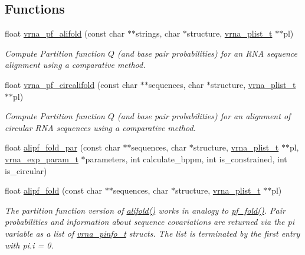 \subsection*{Functions}
\begin{DoxyCompactItemize}
\item 
float \hyperlink{group__consensus__pf__fold_gaef750636c70e597a85ee139197a4350d}{vrna\+\_\+pf\+\_\+alifold} (const char $\ast$$\ast$strings, char $\ast$structure, \hyperlink{group__data__structures_ga8e4eb5e1bfc95776559575beb359af87}{vrna\+\_\+plist\+\_\+t} $\ast$$\ast$pl)
\begin{DoxyCompactList}\small\item\em Compute Partition function $Q$ (and base pair probabilities) for an R\+N\+A sequence alignment using a comparative method. \end{DoxyCompactList}\item 
float \hyperlink{group__consensus__pf__fold_ga017209394a4c1e68d96cd47e61d16d25}{vrna\+\_\+pf\+\_\+circalifold} (const char $\ast$$\ast$sequences, char $\ast$structure, \hyperlink{group__data__structures_ga8e4eb5e1bfc95776559575beb359af87}{vrna\+\_\+plist\+\_\+t} $\ast$$\ast$pl)
\begin{DoxyCompactList}\small\item\em Compute Partition function $Q$ (and base pair probabilities) for an alignment of circular R\+N\+A sequences using a comparative method. \end{DoxyCompactList}\item 
float \hyperlink{group__consensus__pf__fold_ga5e8d54e41bf3d5b6e535d5bdb33c416e}{alipf\+\_\+fold\+\_\+par} (const char $\ast$$\ast$sequences, char $\ast$structure, \hyperlink{group__data__structures_ga8e4eb5e1bfc95776559575beb359af87}{vrna\+\_\+plist\+\_\+t} $\ast$$\ast$pl, \hyperlink{group__energy__parameters_ga01d8b92fe734df8d79a6169482c7d8d8}{vrna\+\_\+exp\+\_\+param\+\_\+t} $\ast$parameters, int calculate\+\_\+bppm, int is\+\_\+constrained, int is\+\_\+circular)
\item 
float \hyperlink{group__consensus__pf__fold_gaa150d3ba7b009a1c27cb6f0eb197f6b4}{alipf\+\_\+fold} (const char $\ast$$\ast$sequences, char $\ast$structure, \hyperlink{group__data__structures_ga8e4eb5e1bfc95776559575beb359af87}{vrna\+\_\+plist\+\_\+t} $\ast$$\ast$pl)
\begin{DoxyCompactList}\small\item\em The partition function version of \hyperlink{group__consensus__mfe__fold_ga4cf00f0659e5f0480335d69e797f05b1}{alifold()} works in analogy to \hyperlink{group__pf__fold_gadc3db3d98742427e7001a7fd36ef28c2}{pf\+\_\+fold()}. Pair probabilities and information about sequence covariations are returned via the \textquotesingle{}pi\textquotesingle{} variable as a list of \hyperlink{group__aln__utils_ga6660dfca23debee7306e0cd53341263f}{vrna\+\_\+pinfo\+\_\+t} structs. The list is terminated by the first entry with pi.\+i = 0. \end{DoxyCompactList}\item 

\end{DoxyCompactItemize}
